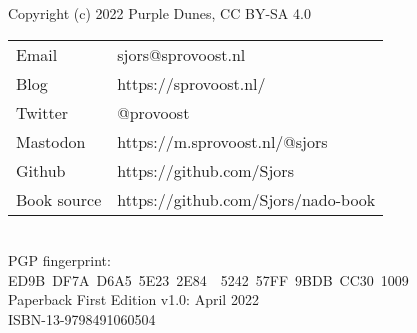 {\setlength{\parindent}{0cm}
Copyright (c) 2022 Purple Dunes, CC BY-SA 4.0\\

\begin{tabular}{@{} l l }
Email & sjors@sprovoost.nl \\
Blog & https://sprovoost.nl/ \\
Twitter & @provoost \\
Mastodon & https://m.sprovoost.nl/@sjors \\
Github & https://github.com/Sjors \\
Book source & https://github.com/Sjors/nado-book \\
\end{tabular}
\\

PGP fingerprint:\\
ED9B DF7A D6A5 5E23 2E84  5242 57FF 9BDB CC30 1009\\

Paperback First Edition v1.0: April 2022\\

ISBN-13-9798491060504\\
}
\newpage
